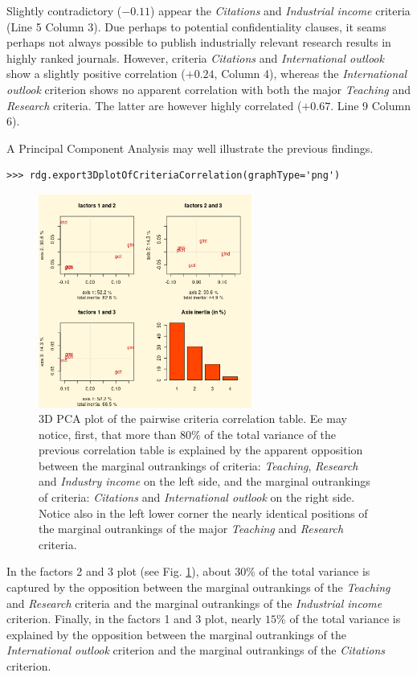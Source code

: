 Slightly contradictory ($-0.11$) appear the \emph{Citations} and \emph{Industrial income} criteria (Line 5 Column 3). Due perhaps to potential confidentiality clauses, it seams perhaps not always possible to publish industrially relevant research results in highly ranked journals. However, criteria \emph{Citations} and \emph{International outlook} show a slightly positive correlation ($+0.24$, Column 4), whereas the \emph{International outlook} criterion shows no apparent correlation with both the major \emph{Teaching} and \emph{Research} criteria. The latter are however highly correlated ($+0.67$. Line 9 Column 6).

A Principal Component Analysis may well illustrate the previous findings.

\begin{lstlisting}
>>> rdg.export3DplotOfCriteriaCorrelation(graphType='png')
\end{lstlisting}

\begin{figure}[h]
\sidecaption
\includegraphics[width=7cm]{Figures/the_cs_3DCorrelation.png}
\caption{3D PCA plot of the pairwise criteria correlation table. Ee may notice, first, that more than $80\%$ of the total variance of the previous correlation table is explained by the apparent opposition between the marginal outrankings of criteria: \emph{Teaching}, \emph{Research} and \emph{Industry income} on the left side, and the marginal outrankings of criteria: \emph{Citations} and \emph{International outlook} on the right side. Notice also in the left lower corner the nearly identical positions of the marginal outrankings of the major \emph{Teaching} and \emph{Research} criteria.}
\label{fig:13.3}       %
\end{figure}

In the factors 2 and 3 plot (see Fig. \ref{fig:13.3}), about $30\%$ of the total variance is captured by the opposition between the marginal outrankings of the \emph{Teaching} and \emph{Research} criteria and the marginal outrankings of the \emph{Industrial income} criterion. Finally, in the factors 1 and 3 plot, nearly $15\%$ of the total variance is explained by the opposition between the marginal outrankings of the \emph{International outlook} criterion and the marginal outrankings of the \emph{Citations} criterion.

